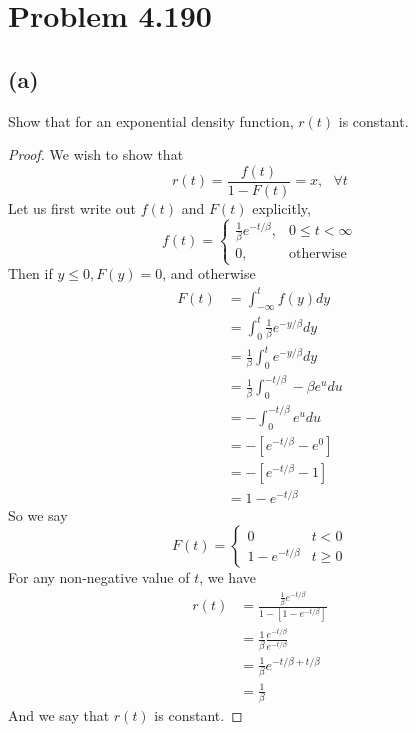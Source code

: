 \documentclass{article}
\theoremstyle{definition}
\begin{document}
\section*{Problem 4.190}
    
    \subsection*{(a)}
        Show that for an exponential density function, $r(t)$ is constant.
        \begin{proof}
            We wish to show that 
            \[
                r(t) = \frac{f(t)}{1- F(t)} = x, \ \ \ \forall t
            \]
            Let us first write out $f(t)$ and $F(t)$ explicitly,
            \[
                f(t) =
                \begin{cases}
                    \frac{1}{\beta}e^{-t / \beta}, & 0 \leq t < \infty\\
                    0, & \text{otherwise}
                \end{cases}
            \]
            Then if $y \leq 0, F(y) = 0$, and otherwise
            \begin{align*}
                F(t) &= \int_{-\infty}^t f(y) dy\\
                &= \int_0^t \frac{1}{\beta}e^{-y / \beta} dy\\
                &= \frac{1}{\beta} \int_0^t e^{-y / \beta} dy\\
                &= \frac{1}{\beta} \int_0^{- t / \beta} -\beta e^u du\\
                &= -\int_0^{- t / \beta} e^u du\\
                &= -[e^{- t / \beta} - e^0]\\
                &= -[e^{- t / \beta} - 1]\\
                &= 1 - e^{- t / \beta}
            \end{align*}
            So we say
            \[
                F(t) = 
                \begin{cases}
                    0 & t < 0\\
                    1 - e^{-t / \beta} & t \geq 0
                \end{cases}
            \]
            For any non-negative value of $t$, we have
            \begin{align*}
                r(t) &= \frac{\frac{1}{\beta}e^{-t / \beta}}{1- [1 - e^{-t / \beta}]}\\
                &= \frac{1}{\beta}\frac{e^{-t / \beta}}{e^{- t / \beta}}\\
                &= \frac{1}{\beta} e^{-t / \beta + t / \beta}\\
                & = \frac{1}{\beta}
            \end{align*}
            And we say that $r(t)$ is constant.
        \end{proof}
\end{document}
